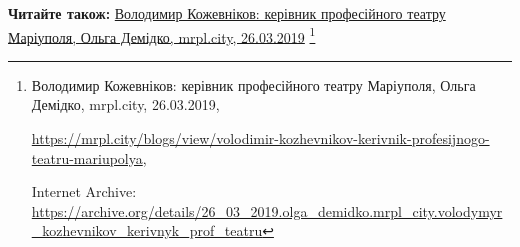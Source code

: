  
 
 
 
 

\textbf{Читайте також:} \href{https://archive.org/details/26_03_2019.olga_demidko.mrpl_city.volodymyr_kozhevnikov_kerivnyk_prof_teatru}{%
Володимир Кожевніков: керівник професійного театру Маріуполя, Ольга Демідко, mrpl.city, 26.03.2019}%
\footnote{Володимир Кожевніков: керівник професійного театру Маріуполя, Ольга Демідко, mrpl.city, 26.03.2019, \par\url{https://mrpl.city/blogs/view/volodimir-kozhevnikov-kerivnik-profesijnogo-teatru-mariupolya}, \par Internet Archive: \url{https://archive.org/details/26_03_2019.olga_demidko.mrpl_city.volodymyr_kozhevnikov_kerivnyk_prof_teatru}}

